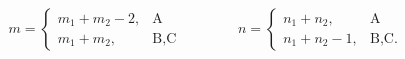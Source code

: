 \begin{equation}
m=
\begin{cases}
m_1+m_2-2,&\mbox{A}\\ 
m_1+m_2,&\mbox{B,C}
\end{cases}
\qquad\qquad n=
\begin{cases}
n_1+n_2,&\mbox{A}\\
n_1+n_2-1,&\mbox{B,C}.
\end{cases}
\label{Isingmn}
\end{equation}

